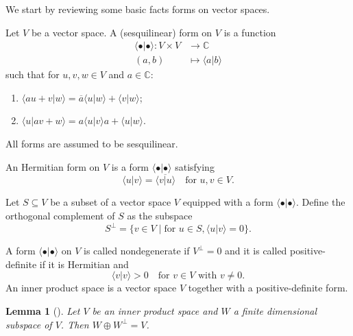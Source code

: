 \documentclass[a4paper, 12pt, reqno]{amsart}
\newtheorem{lemma}[theorem]{Lemma}
\theoremstyle{remark}
\numberwithin{equation}{subsection}
\begin{document}
We start by reviewing some basic facts forms on vector spaces.

Let $V$ be a vector space.
A (sesquilinear) form on $V$ is a function
\begin{align*}
  \langle \bullet| \bullet\rangle: V \times V &\to \mathbb{C} \\
  (a, b) &\mapsto \langle a| b\rangle
\end{align*}
such that for $u, v, w \in V$ and $a \in \mathbb{C}$:
\begin{enumerate}
\item $\langle au + v| w\rangle = \overline{a}\langle u| w\rangle + \langle v| w\rangle$;
\item $\langle u| av + w\rangle = a\langle u| v\rangle a + \langle u| w\rangle$.
\end{enumerate}
All forms are assumed to be sesquilinear.

An Hermitian form on $V$ is a form $\langle \bullet| \bullet\rangle$ satisfying
\begin{equation*}
  \langle u| v\rangle = \overline{\langle v| u\rangle} \quad \text{for }u, v \in V.
\end{equation*}

Let $S \subseteq V$ be a subset of a vector space $V$ equipped with a form $\langle \bullet| \bullet\rangle$.
Define the orthogonal complement of $S$ as the subspace
\begin{equation*}
  S^{\perp} = \{v \in V \mid \text{for }u \in S, \langle u| v\rangle = 0\}.
\end{equation*}

A form $\langle \bullet| \bullet\rangle$ on $V$ is called nondegenerate if $V^{\perp} = 0$ and it is called positive-definite if it is Hermitian and
\begin{equation*}
  \langle v| v\rangle > 0 \quad \text{for }v \in V \text{ with } v \neq 0.
\end{equation*}
An inner product space is a vector space $V$ together with a positive-definite form.

\begin{lemma}[{\cite[\S8.2 Theorem 5]{hoffman_linear_1971}}]
  \label{lmm:15}
  Let $V$ be an inner product space and $W$ a finite dimensional subspace of $V$.
  Then $W \oplus W^{\perp}=V$.
\end{lemma}
\end{document}
